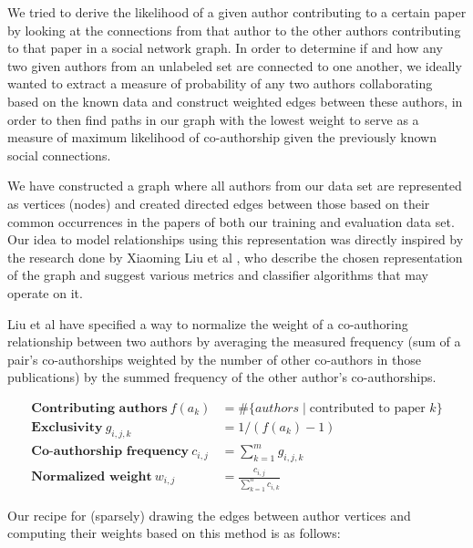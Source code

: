 
We tried to derive the likelihood of a given author contributing to a certain paper by looking at the connections from that author to the other authors contributing to that paper in a social network graph.
In order to determine if and how any two given authors from an unlabeled set are connected to one another, we ideally wanted to extract a measure of probability of any two authors collaborating based on the known data and construct weighted edges between these authors, in order to then find paths in our graph with the lowest weight to serve as a measure of maximum likelihood of co-authorship given the previously known social connections.

We have constructed a graph where all authors from our data set are represented as vertices (nodes) and created directed edges between those based on their common occurrences in the papers of both our training and evaluation data set.
Our idea to model relationships using this representation was directly inspired by the research done by Xiaoming Liu et al \cite{liu2005co}, who describe the chosen representation of the graph and suggest various metrics and classifier algorithms that may operate on it.

Liu et al have specified a way to normalize the weight of a co-authoring relationship between two authors by averaging the measured frequency (sum of a pair's co-authorships weighted by the number of other co-authors in those publications) by the summed frequency of the other author's co-authorships.

\begin{align*}
\textbf{Contributing authors}~
	f(a_k) &= \#\{ authors \mid \mbox{contributed to paper } k \} \\
\textbf{Exclusivity}~
	g_{i,j,k} &= 1 / (f(a_k)-1) \\
\textbf{Co-authorship frequency}~
	c_{i,j} &= \sum_{k=1}^{m} g_{i,j,k} \\
\textbf{Normalized weight}~
	w_{i,j} &= \frac{c_{i,j}}{\sum_{k=1}^{n} c_{i,k}}
\end{align*}

Our recipe for (sparsely) drawing the edges between author vertices and computing their weights based on this method is as follows:


